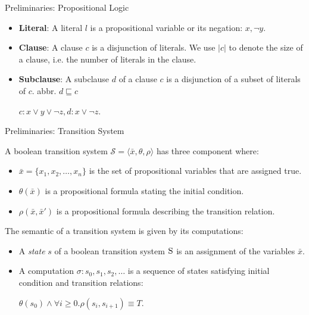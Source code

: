 \documentclass[aspectratio=1610, 13pt]{beamer}
\begin{document}
\begin{frame}{Preliminaries: Propositional Logic}
	\begin{itemize}
	\item \textbf{Literal}: A literal $l$ is a propositional variable or its negation: $x, \neg y$.
	\item \textbf{Clause}: A clause $c$ is a disjunction of literals. We use $|c|$ to denote the size of a clause, i.e. the number of literals in the clause.
	\item \textbf{Subclause}: A subclause $d$ of a clause $c$ is a disjunction of a subset of literals of $c$. abbr. $d \sqsubseteq c$
	
	$c: x\vee y \vee \neg z, d: x\vee \neg z$. 
	\end{itemize}
\end{frame}
\begin{frame}{Preliminaries: Transition System}
\begin{definition}
A boolean transition system $\mathcal{S} = \langle \bar{x}, \theta, \rho\rangle$ has three component where:

\begin{itemize}

\item $\bar{x} = \{x_1, x_2, \ldots, x_n\}$ is the set of propositional variables that are assigned true.
\item $\theta(\bar{x})$ is a propositional formula stating the initial condition.
\item $\rho(\bar{x}, \bar{x}')$ is a propositional formula describing the transition relation.

\end{itemize}
\end{definition}
The semantic of a transition system is given by its computations:
\begin{definition}
\begin{itemize}
\item A \textit{state} $s$ of a boolean transition system $\textsc{S}$ is an assignment of the variables $\bar{x}$.
\item A computation $\sigma: s_0, s_1, s_2, \ldots
$ is a sequence of states satisfying initial condition and transition relations: 

$\theta(s_0) \wedge \forall i \ge 0. \rho(s_i, s_{i+1}) \equiv T$.
\end{itemize}

\end{definition}
\end{frame}
\end{document}
